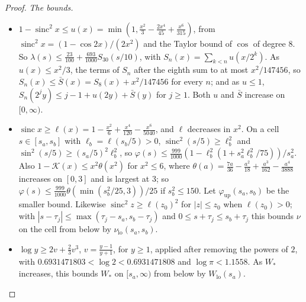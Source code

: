 \documentclass[11pt]{article}
\theoremstyle{definition}
\newcommand{\sinc}{\operatorname{sinc}}
\begin{document}
\begin{proof}
\emph{The bounds.}
\begin{itemize}
\item[(a)] $1 - \sinc^2 x \le u(x) = \min(1, \frac{x^2}3 - \frac{2x^4}{45} + \frac{x^6}{315})$, from
$\sinc^2 x = (1 - \cos 2x)/(2x^2)$ and the Taylor bound of $\cos$ of degree $8$. So $\lambda(s) \le \frac{23}{100} +
\frac{693}{1000} S_{30}(s/10)$, with $S_n(x) = \sum_{k < n} u(x/2^k)$. As $u(x) \le x^2/3$, the terms of $S_n$ after the
eighth sum to at most $x^2/147456$, so $S_n(x) \le \bar S(x) =
S_8(x) + x^2/147456$ for every $n$; and as $u \le 1$, $S_n(2^j
y) \le j - 1 + u(2y) + \bar S(y)$ for $j \ge 1$. Both $u$ and $\bar S$ increase on $[0, \infty)$.
\item[(b)] $\sinc x \ge \ell(x) = 1 - \frac{x^2}6 + \frac{x^4}{120}
- \frac{x^6}{5040}$, and $\ell$ decreases in $x^2$. On a
cell $s \in [s_a, s_b]$ with $\ell_b = \ell(s_b/5) > 0$, $\sinc^2(s/5) \ge \ell_b^2$ and $\sin^2(s/5) \ge (s_a/5)^2
\ell_b^2$, so $\varphi(s) \le \frac{999}{1000}(1 - \ell_b^2(1 + s_a^2 \ell_b^2/75))/s_a^2$. Also $1 - \mathcal K(x) \le
x^2 \theta(x^2)$ for $x^2 \le 6$, where $\theta(a) = \frac{7a}{36} - \frac{a^2}{18} + \frac{a^3}{162} -
\frac{a^4}{3888}$
increases on $[0, 3]$ and is largest at $3$; so $\varphi(s) \le \frac{999}{1000}\theta(\min(s_b^2/25, 3))/25$ if $s_b^2
\le 150$. Let $\varphi_{\mathrm{up}}(s_a, s_b)$ be the smaller bound. Likewise $\sinc^2 z \ge \ell(z_0)^2$ for $|z| \le
z_0$ when $\ell(z_0) > 0$; with $|s - \tau_j| \le \max(\tau_j - s_a, s_b - \tau_j)$ and $0 \le s + \tau_j \le
s_b + \tau_j$ this bounds $\nu$ on the cell from below by $\nu_{\mathrm{lo}}(s_a, s_b)$.
\item[(c)] $\log y \ge 2v + \frac23 v^3$, $v = \frac{y - 1}{y
+ 1}$, for $y \ge 1$, applied after removing the powers of $2$,
with $0.6931471803 < \log 2 < 0.6931471808$ and $\log \pi <
1.1558$. As $W_*$ increases, this bounds $W_*$ on $[s_a, \infty)$
from below by $W_{\mathrm{lo}}(s_a)$.
\end{itemize}


\end{proof}
\end{document}
